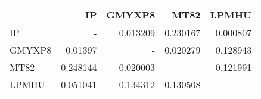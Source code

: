 \begin{tabular}{l|rrrr}

{} &        IP &    GMYXP8 &      MT82 &     LPMHU \\ \hline\hline

IP     &       - &  0.013209 &  0.230167 &  0.000807 \\
GMYXP8 &   0.01397 &       - &  0.020279 &  0.128943 \\
MT82   &  0.248144 &  0.020003 &       - &  0.121991 \\
LPMHU  &  0.051041 &  0.134312 &  0.130508 &       - \\ \hline\hline

\end{tabular}
